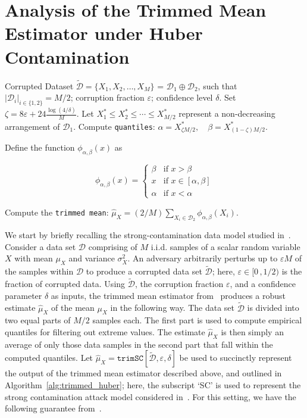 \documentclass{article}
\newcommand{\mc}{\mathcal}
\begin{document}
\section{Analysis of the Trimmed Mean Estimator under Huber Contamination }
\label{app:TrimmedMean}
\begin{algorithm}[H]
\caption{Univariate Trimmed-Mean Estimator from \cite{lugosi} (\texttt{trimSC})}
\label{alg:trimmed_huber}
\begin{algorithmic}[1]
\REQUIRE Corrupted Dataset \(\mc{\tilde{D}} = \{X_1, X_2, \ldots, X_M\}\) = \(\mc{D}_1 \oplus \mc{D}_2\), such that \(|\mc{D}_i|_{i \in \{1,2\}} = M/2\); corruption fraction \(\varepsilon\); confidence level \(\delta\).
\STATE Set \(\zeta = 8 \varepsilon + 24\frac{\log(4/\delta)}{M}\).
\STATE Let \(X^*_1 \leq X^*_2 \leq \cdots \leq  X^*_{M/2}\) represent a non-decreasing arrangement of \(\mc{D}_1\).
\STATE Compute \textcolor{mygreen}{\texttt{quantiles}}:
\(\alpha = X^*_{\zeta M/2}, \quad \beta = X^*_{(1 - \zeta) M/2}.\)

\STATE Define the function \(\phi_{\alpha,\beta}(x)\) as
\STATE \begin{minipage}{0.95\linewidth}
\[
\phi_{\alpha,\beta}(x) = \begin{cases}
\beta & \text{if } x > \beta \\
x & \text{if } x \in [\alpha, \beta] \\
\alpha & \text{if } x < \alpha
\end{cases}
\]
\end{minipage}

\STATE Compute the \textcolor{winered}{\texttt{trimmed mean}}:
\(\hat{\mu}_X = (2/M) \sum_{X_i \in \mc{D}_2}^{} \phi_{\alpha,\beta}(X_i)\).
\end{algorithmic}
\end{algorithm}
We start by briefly recalling the strong-contamination data model studied in~\citet{lugosi}. Consider a data set $\mc{D}$ comprising of $M$ i.i.d. samples of a scalar random variable $X$ with mean $\mu_X$ and variance $\sigma^2_X$. An adversary arbitrarily perturbs up to $\varepsilon M$ of the samples within $\mc{D}$ to produce a corrupted data set $\tilde{\mc{D}}$; here, $\varepsilon \in [0 \, ,1/2)$ is the fraction of corrupted data. Using $\tilde{\mc{D}}$, the corruption fraction $\varepsilon$, and a confidence parameter $\delta$ as inputs, the trimmed mean estimator from~\citet{lugosi} produces a robust estimate $\hat{\mu}_X$ of the mean $\mu_X$ in the following way. The data set $\tilde{\mc{D}}$ is divided into two equal parts of $M/2$ samples each. The first part is used to compute empirical quantiles for filtering out extreme values. The estimate $\hat{\mu}_X$ is then simply an average of only those data samples in the second part that fall within the computed quantiles. Let $\hat{\mu}_X = \texttt{trimSC}[\tilde{\mc{D}}, \varepsilon, \delta]$ be used to succinctly represent the output of the trimmed mean estimator described above, and outlined in Algorithm~\ref{alg:trimmed_huber}; here, the subscript `SC' is used to represent the strong contamination attack model considered in~\citet{lugosi}. For this setting, we have the following guarantee from~\citet{lugosi}.
\end{document}

